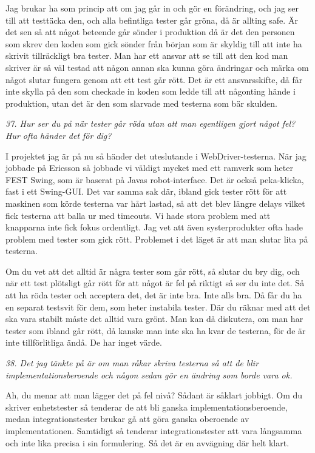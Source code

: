 \documentclass[11pt]{article}
\begin{document}
Jag brukar ha som princip att om jag går in och gör en förändring, och jag ser till att testtäcka den, och alla befintliga tester går gröna, då är allting safe. Är det sen så att något beteende går sönder i produktion då är det den personen som skrev den koden som gick sönder från början som är skyldig till att inte ha skrivit tillräckligt bra tester. Man har ett ansvar att se till att den kod man skriver är så väl testad att någon annan ska kunna göra ändringar och märka om något slutar fungera genom att ett test går rött. Det är ett ansvarsskifte, då får inte skylla på den som checkade in koden som ledde till att någonting hände i produktion, utan det är den som slarvade med testerna som bär skulden.

\emph{37. Hur ser du på när tester går röda utan att man egentligen gjort något fel? Hur ofta händer det för dig?}

I projektet jag är på nu så händer det uteslutande i WebDriver-testerna. När jag jobbade på Ericsson så jobbade vi väldigt mycket med ett ramverk som heter FEST Swing, som är baserat på Javas robot-interface. Det är också peka-klicka, fast i ett Swing-GUI. Det var samma sak där, ibland gick tester rött för att maskinen som körde testerna var hårt lastad, så att det blev längre delays vilket fick testerna att balla ur med timeouts. Vi hade stora problem med att knapparna inte fick fokus ordentligt. Jag vet att även systerprodukter ofta hade problem med tester som gick rött. Problemet i det läget är att man slutar lita på testerna.

Om du vet att det alltid är några tester som går rött, så slutar du bry dig, och när ett test plötsligt går rött för att något är fel på riktigt så ser du inte det. Så att ha röda tester och acceptera det, det är inte bra. Inte alls bra. Då får du ha en separat testsvit för dem, som heter instabila tester. Där du räknar med att det ska vara stabilt måste det alltid vara grönt. Man kan då diskutera, om man har tester som ibland går rött, då kanske man inte ska ha kvar de testerna, för de är inte tillförlitliga ändå. De har inget värde.

\emph{38. Det jag tänkte på är om man råkar skriva testerna så att de blir implementationsberoende och någon sedan gör en ändring som borde vara ok.}

Ah, du menar att man lägger det på fel nivå? Sådant är såklart jobbigt. Om du skriver enhetstester så tenderar de att bli ganska implementationsberoende, medan integrationstester brukar gå att göra ganska oberoende av implementationen. Samtidigt så tenderar integrationstester att vara långsamma och inte lika precisa i sin formulering. Så det är en avvägning där helt klart.
\end{document}
